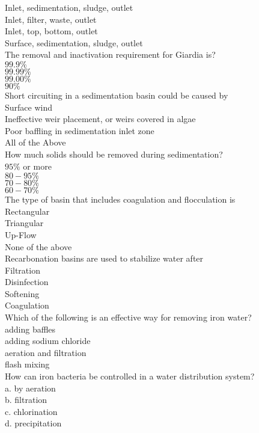 Inlet, sedimentation, sludge, outlet\\
Inlet, filter, waste, outlet\\
Inlet, top, bottom, outlet\\
Surface, sedimentation, sludge, outlet\\
The removal and inactivation requirement for Giardia is?\\
$99.9 \%$\\
$99.99 \%$\\
$99.00 \%$\\
$90 \%$\\
Short circuiting in a sedimentation basin could be caused by\\
Surface wind\\
Ineffective weir placement, or weirs covered in algae\\
Poor baffling in sedimentation inlet zone\\
All of the Above\\
How much solids should be removed during sedimentation?\\
$95 \%$ or more\\
$80-95 \%$\\
$70-80 \%$\\
$60-70 \%$\\
The type of basin that includes coagulation and flocculation is\\
Rectangular\\
Triangular\\
Up-Flow\\
None of the above\\
Recarbonation basins are used to stabilize water after\\
Filtration\\
Disinfection\\
Softening\\
Coagulation\\
Which of the following is an effective way for removing iron water?\\
	adding baffles\\
	adding sodium chloride\\
	aeration and filtration\\
	flash mixing\\
How can iron bacteria be controlled in a water distribution system?\\
a.	by aeration\\
b.	filtration\\
c.	chlorination\\
d.	precipitation\\
